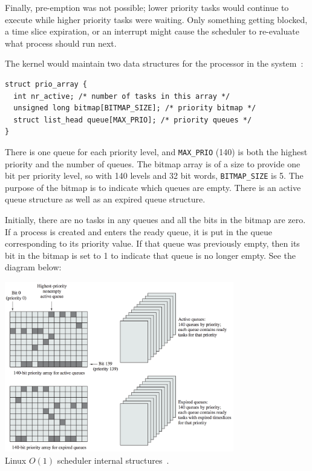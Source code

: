 Finally, pre-emption was not possible; lower priority tasks would continue to execute while higher priority tasks were waiting. Only something getting blocked, a time slice expiration, or an interrupt might cause the scheduler to re-evaluate what process should run next.

The kernel would maintain two data structures for the processor in the system~\cite{osi}:

\begin{verbatim}
struct prio_array {
  int nr_active; /* number of tasks in this array */
  unsigned long bitmap[BITMAP_SIZE]; /* priority bitmap */
  struct list_head queue[MAX_PRIO]; /* priority queues */
}
\end{verbatim}

There is one queue for each priority level, and \texttt{MAX\_PRIO} (140) is both the highest priority and the number of queues. The bitmap array is of a size to provide one bit per priority level, so with 140 levels and 32 bit words, \texttt{BITMAP\_SIZE} is 5. The purpose of the bitmap is to indicate which queues are empty. There is an active queue structure as well as an expired queue structure.

Initially, there are no tasks in any queues and all the bits in the bitmap are zero. If a process is created and enters the ready queue, it is put in the queue corresponding to its priority value. If that queue was previously empty, then its bit in the bitmap is set to 1 to indicate that queue is no longer empty. See the diagram below:

\begin{center}
	\includegraphics[width=0.75\textwidth]{images/linux-o1-struct.png}\\
	Linux $O(1)$ scheduler internal structures~\cite{osi}.
\end{center}

